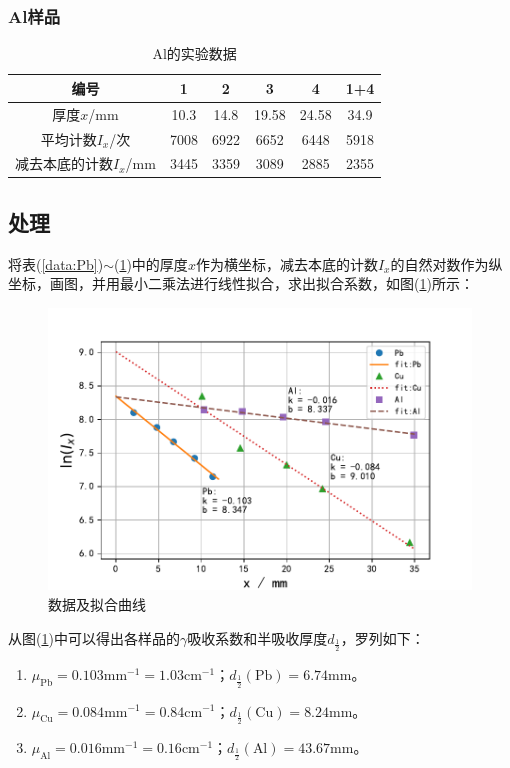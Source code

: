 \documentclass[a4paper]{article}
\begin{document}
\subsubsection{Al样品}
\begin{table}[!h]
\centering
\begin{tabular}{|c|c|c|c|c|c|}
\hline
编号	&	1	&	2	&	3	&	4	&	1+4\\ \hline
厚度$x$/mm	&	10.3	&	14.8	&	19.58	&	24.58	&	34.9\\ \hline
平均计数$I_x$/次	&	7008	&	6922	&	6652	&	6448	&	5918\\ \hline
减去本底的计数$I_x$/mm & 3445 & 3359 & 3089 & 2885 & 2355\\ \hline
\end{tabular}
\caption{Al的实验数据}\label{data:Al}
\end{table}

\subsection{处理}
将表(\ref{data:Pb})$\sim$(\ref{data:Al})中的厚度$x$作为横坐标，减去本底的计数$I_x$的自然对数作为纵坐标，画图，并用最小二乘法进行线性拟合，求出拟合系数，如图(\ref{datafig})所示：
\begin{figure}[!h]
\centering
\includegraphics[width=\textwidth]{fig/all.pdf}
\caption{数据及拟合曲线}\label{datafig}
\end{figure}

从图(\ref{datafig})中可以得出各样品的$\gamma$吸收系数和半吸收厚度$d_{\frac{1}{2}}$，罗列如下：
\begin{enumerate}
\item $\mu_{\text{Pb}} = 0.103\text{mm}^{-1} = 1.03\text{cm}^{-1}$；$d_{\frac12}(\text{Pb}) = 6.74\text{mm}$。
\item $\mu_{\text{Cu}} = 0.084\text{mm}^{-1} = 0.84\text{cm}^{-1}$；$d_{\frac12}(\text{Cu}) = 8.24\text{mm}$。
\item $\mu_{\text{Al}} = 0.016\text{mm}^{-1} = 0.16\text{cm}^{-1}$；$d_{\frac12}(\text{Al}) = 43.67\text{mm}$。
\end{enumerate}
\end{document}
